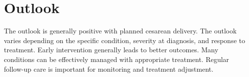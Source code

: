 \section{Outlook}
The outlook is generally positive with planned cesarean delivery. The outlook varies depending on the specific condition, severity at diagnosis, and response to treatment. Early intervention generally leads to better outcomes. Many conditions can be effectively managed with appropriate treatment. Regular follow-up care is important for monitoring and treatment adjustment.
